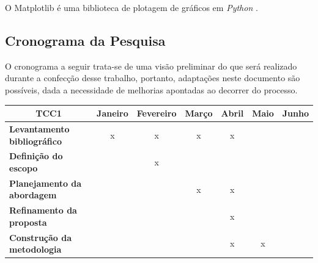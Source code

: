 O Matplotlib é uma biblioteca de plotagem de gráficos em \textit{Python} \cite{Matplotlib}.

\subsection{Cronograma da Pesquisa}

O cronograma a seguir trata-se de uma visão preliminar do que será realizado durante a confecção desse trabalho, portanto, adaptações neste documento são possíveis, dada a necessidade de melhorias apontadas ao decorrer do processo.

\begin{table}[]
	\begin{tabular}{|l|c|c|c|c|c|c|}
	\hline
	\multicolumn{1}{|c|}{\textbf{TCC1}}          & \multicolumn{1}{l|}{\textbf{Janeiro}} & \multicolumn{1}{l|}{\textbf{Fevereiro}} & \multicolumn{1}{l|}{\textbf{Março}} & \multicolumn{1}{l|}{\textbf{Abril}} & \multicolumn{1}{l|}{\textbf{Maio}} & \multicolumn{1}{l|}{\textbf{Junho}} \\ \hline
	\textbf{Levantamento bibliográfico}          & x                                     & x                                       & x                                   & x                                   &                                    &                                     \\ \hline
	\textbf{Definição do escopo}                 &                                       & x                                       &                                     &                                     &                                    &                                     \\ \hline
	\textbf{Planejamento da abordagem}           &                                       &                                         & x                                   & x                                   &                                    &                                     \\ \hline
	\textbf{Refinamento da proposta}             &                                       &                                         &                                     & x                                   &                                    &                                     \\ \hline
	\textbf{Construção da metodologia}           &                                       &                                         &                                     & x                                   & x                                  &                                     \\ \hline

\end{tabular}
\end{table}

